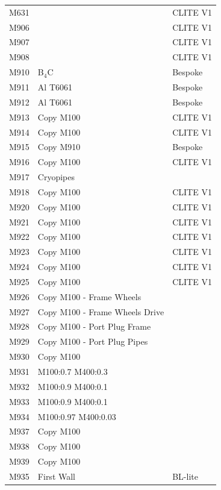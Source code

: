 \documentclass[12pt]{article}
\begin{document}
\begin{centering}
\begin{longtable}[ht!]{ p{} | p{} | p{} }
  M631  & &  CLITE V1 \\
  M906  & &  CLITE V1 \\
  M907  & &  CLITE V1 \\
  M908  & &  CLITE V1 \\
  M910 & B$_4$C & Bespoke  \\
  M911 & Al T6061 & Bespoke  \\
  M912 & Al T6061 & Bespoke  \\
  M913 & Copy M100 & CLITE V1\\
  M914 & Copy M100 & CLITE V1\\
  M915 & Copy M910 & Bespoke \\
  M916 & Copy M100 & CLITE V1\\
  M917 & Cryopipes & \cite{cryopump_communication}\\
  M918 & Copy M100 & CLITE V1 \\
  M920 & Copy M100 & CLITE V1 \\
  M921 & Copy M100 & CLITE V1 \\
  M922 & Copy M100 & CLITE V1 \\
  M923 & Copy M100 & CLITE V1 \\
  M924 & Copy M100 & CLITE V1 \\
  M925 & Copy M100 & CLITE V1 \\
  M926 & Copy M100 - Frame Wheels & \cite{bertalot_communication}\\
  M927 & Copy M100 - Frame Wheels Drive & \cite{bertalot_communication}\\
  M928 & Copy M100 - Port Plug Frame & \cite{bertalot_communication}\\
  M929 & Copy M100 - Port Plug Pipes & \cite{bertalot_communication}\\
  M930 & Copy M100 & \cite{cryopump_communication}\\
  M931 & M100:0.7 M400:0.3 & \cite{bertalot_communication}\\
  M932 & M100:0.9 M400:0.1 & \cite{bertalot_communication}\\
  M933 & M100:0.9 M400:0.1 & \cite{bertalot_communication}\\
  M934 & M100:0.97 M400:0.03 & \cite{bertalot_communication}\\
  M937 & Copy M100 & \cite{cryopump_communication}\\
  M938 & Copy M100 & \cite{cryopump_communication}\\
  M939 & Copy M100 & \cite{cryopump_communication}\\
  M935 & First Wall & BL-lite \\

\end{longtable}
\end{centering}
\end{document}
